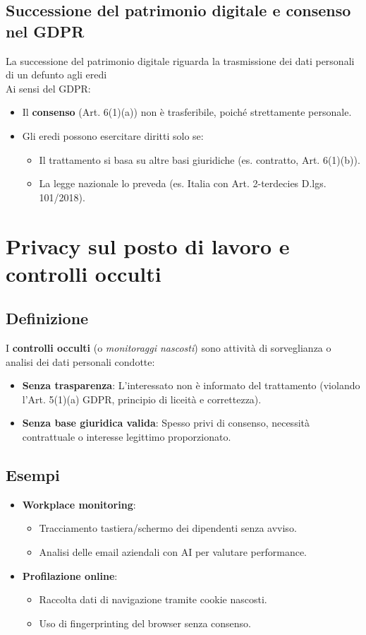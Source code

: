 \documentclass[8pt,oneside,a4paper]{article}
\begin{document}
	\subsection{Successione del patrimonio digitale e consenso nel GDPR}
	La successione del patrimonio digitale riguarda la trasmissione dei dati personali di un defunto agli eredi\\
	Ai sensi del GDPR:
	\begin{itemize}
		\item Il \textbf{consenso} (Art. 6(1)(a)) non è trasferibile, poiché strettamente personale.
		\item Gli eredi possono esercitare diritti solo se:
		\begin{itemize}
			\item Il trattamento si basa su altre basi giuridiche (es. contratto, Art. 6(1)(b)).
			\item La legge nazionale lo preveda (es. Italia con Art. 2-terdecies D.lgs. 101/2018).
		\end{itemize}
	\end{itemize}
	\section{Privacy sul posto di lavoro e controlli occulti}  
	\subsection{Definizione}  
	I \textbf{controlli occulti} (o \textit{monitoraggi nascosti}) sono attività di sorveglianza o analisi dei dati personali condotte:  
	\begin{itemize}  
		\item \textbf{Senza trasparenza}: L’interessato non è informato del trattamento (violando l’Art. 5(1)(a) GDPR, principio di liceità e correttezza).  
		\item \textbf{Senza base giuridica valida}: Spesso privi di consenso, necessità contrattuale o interesse legittimo proporzionato.  
	\end{itemize}  
	\subsection{Esempi}  
	\begin{itemize}  
		\item \textbf{Workplace monitoring}:  
		\begin{itemize}  
			\item Tracciamento tastiera/schermo dei dipendenti senza avviso.  
			\item Analisi delle email aziendali con AI per valutare performance.  
		\end{itemize}  
		\item \textbf{Profilazione online}:  
		\begin{itemize}  
			\item Raccolta dati di navigazione tramite cookie nascosti.  
			\item Uso di fingerprinting del browser senza consenso.  
		\end{itemize}  
	\end{itemize}  
\end{document}
